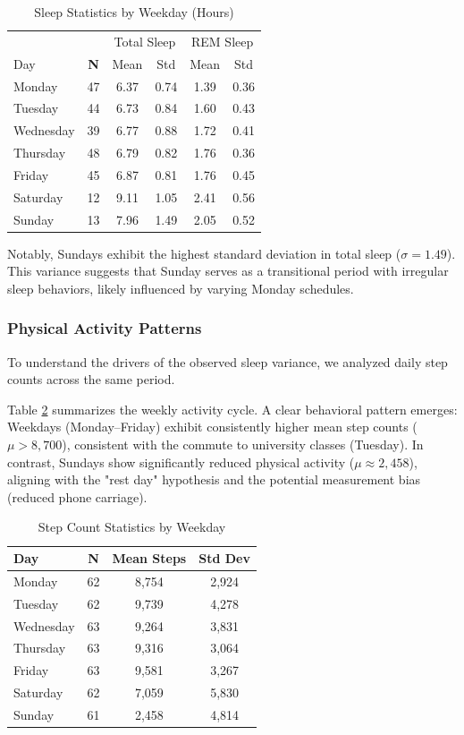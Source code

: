 \documentclass[conference]{IEEEtran}
\begin{document}
\begin{table}[h]
\centering
\caption{Sleep Statistics by Weekday (Hours)}
\label{tab:weekday_stats}
\begin{tabular}{@{}lccccc@{}}
\toprule
 & & \multicolumn{2}{c}{Total Sleep} & \multicolumn{2}{c}{REM Sleep} \\
Day & \textbf{N} & Mean & Std & Mean & Std \\ \midrule
Monday    & 47 & 6.37 & 0.74 & 1.39 & 0.36 \\
Tuesday   & 44 & 6.73 & 0.84 & 1.60 & 0.43 \\
Wednesday & 39 & 6.77 & 0.88 & 1.72 & 0.41 \\
Thursday  & 48 & 6.79 & 0.82 & 1.76 & 0.36 \\
Friday    & 45 & 6.87 & 0.81 & 1.76 & 0.45 \\
Saturday  & 12 & 9.11 & 1.05 & 2.41 & 0.56 \\
Sunday    & 13 & 7.96 & 1.49 & 2.05 & 0.52 \\ \bottomrule
\end{tabular}
\end{table}

Notably, Sundays exhibit the highest standard deviation in total sleep ($\sigma = 1.49$). This variance suggests that Sunday serves as a transitional period with irregular sleep behaviors, likely influenced by varying Monday schedules.

\subsubsection{Physical Activity Patterns}
To understand the drivers of the observed sleep variance, we analyzed daily step counts across the same period.

Table \ref{tab:step_stats} summarizes the weekly activity cycle. A clear behavioral pattern emerges: Weekdays (Monday--Friday) exhibit consistently higher mean step counts ($\mu > 8,700$), consistent with the commute to university classes (Tuesday). In contrast, Sundays show significantly reduced physical activity ($\mu \approx 2,458$), aligning with the "rest day" hypothesis and the potential measurement bias (reduced phone carriage).

\begin{table}[h]
\centering
\caption{Step Count Statistics by Weekday}
\label{tab:step_stats}
\begin{tabular}{@{}lccc@{}}
\toprule
Day & N & Mean Steps & Std Dev \\ \midrule
Monday    & 62 & 8,754 & 2,924 \\
Tuesday   & 62 & 9,739 & 4,278 \\
Wednesday & 63 & 9,264 & 3,831 \\
Thursday  & 63 & 9,316 & 3,064 \\
Friday    & 63 & 9,581 & 3,267 \\
Saturday  & 62 & 7,059 & 5,830 \\
Sunday    & 61 & 2,458 & 4,814 \\ \bottomrule
\end{tabular}
\end{table}
\end{document}
